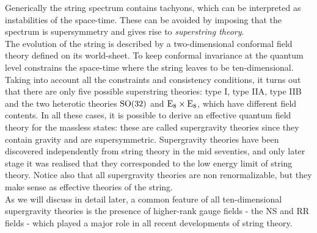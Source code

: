 \documentclass[draft]{phd}
\begin{document}
Generically the string spectrum contains 
tachyons, which can be interpreted as instabilities of the space-time.
These can be avoided by imposing that the spectrum is  supersymmetry and  gives rise to \emph{superstring theory}. \\
The evolution of the string is described by  a two-dimensional conformal field theory defined on its world-sheet. 
To keep conformal invariance at the quantum level 
constrains the space-time where the string leaves  to be ten-dimensional.  \\
Taking into account all the constraints and consistency conditions, it turns out that there are only five possible superstring theories: type I, type IIA, type IIB and the two heterotic theories $\mathrm{SO}(32)$ and $\mathrm{E}_8 \times \mathrm{E}_8$, which have different field contents. 
In all these cases, it is possible to derive an effective quantum field theory  for the massless states: these are  called supergravity theories since they contain gravity and are
supersymmetric.  Supergravity theories have been discovered independently from string theory in the mid seventies, 
and only later stage it was  realised that they corresponded to the low energy limit of string theory.
Notice also  that all supergravity theories are non renormalizable, but they make sense as effective theories of the string. \\
As we will discuss in detail later,  a common feature of all ten-dimensional supergravity theories is the presence of higher-rank gauge fields - the NS and RR fields - 
which played a major role in all recent developments of string theory.
\end{document}
